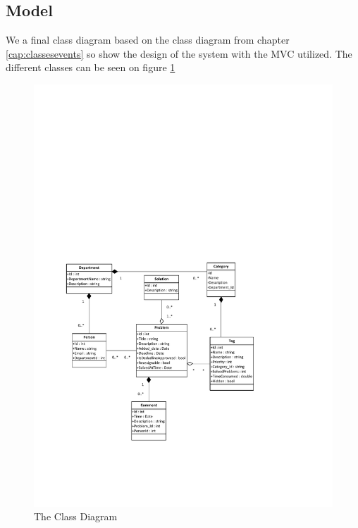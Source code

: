 \subsection{Model}
We a final class diagram based on the class diagram from chapter \ref{cap:classesevents} so show the design of the system with the MVC utilized.
The different classes can be seen on figure \ref{fig:ClassDiagramV2}


\begin{figure}%
\includegraphics[width=\columnwidth]{input/component_design/ClassDiagramV2.pdf}%
\caption{The Class Diagram}%
\label{fig:ClassDiagramV2}%
\end{figure}


